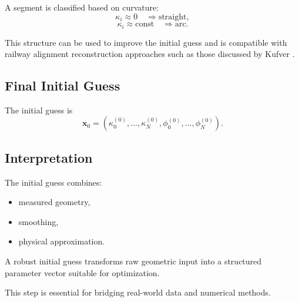 \begin{definition}
A segment is classified based on curvature:
\[
\kappa_i \approx 0 \quad \Rightarrow \text{straight},
\]
\[
\kappa_i \approx \text{const} \quad \Rightarrow \text{arc}.
\]
\end{definition}

This structure can be used to improve the initial guess and is
compatible with railway alignment reconstruction approaches such as
those discussed by Kufver
\cite{Kufver1997MathematicalDescription,Kufver2000RailwayAlignment}.

\subsection{Final Initial Guess}

\begin{definition}
The initial guess is
\[
\mathbf{x}_0 =
(\kappa_0^{(0)},\dots,\kappa_N^{(0)},
\phi_0^{(0)},\dots,\phi_N^{(0)}).
\]
\end{definition}

\subsection{Interpretation}

The initial guess combines:
\begin{itemize}
\item measured geometry,
\item smoothing,
\item physical approximation.
\end{itemize}

\begin{summary}
A robust initial guess transforms raw geometric input into a structured
parameter vector suitable for optimization.

This step is essential for bridging real-world data and numerical
methods.
\end{summary}

